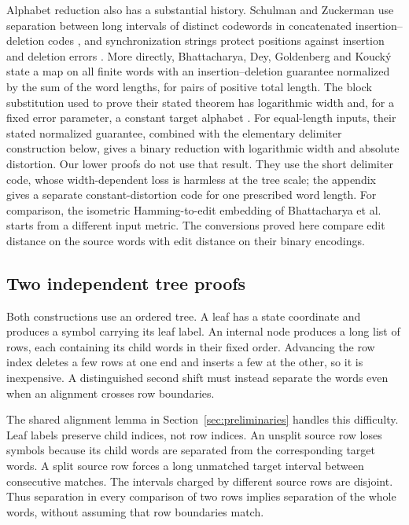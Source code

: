 Alphabet reduction also has a substantial history. Schulman and
Zuckerman use separation between long intervals of distinct codewords
in concatenated insertion--deletion codes \cite{SchulmanZuckerman1999},
and synchronization strings protect positions against insertion and
deletion errors \cite{HaeuplerShahrasbi2017}. More directly,
Bhattacharya, Dey, Goldenberg and Kouck\'y state a map on all finite
words with an insertion--deletion guarantee normalized by the sum of
the word lengths, for pairs of positive total length. The block
substitution used to prove their stated theorem has logarithmic width
and, for a fixed error parameter, a constant target alphabet
\cite[Theorem~3; full version, Section~3.2.1 and Lemma~3.3]{BhattacharyaDeyGoldenbergKoucky2024}.
For equal-length inputs, their stated normalized guarantee, combined
with the elementary delimiter construction below, gives a binary
reduction with logarithmic width and absolute distortion. Our lower
proofs do not use that result. They use the short delimiter code, whose
width-dependent loss is harmless at the tree scale; the appendix gives
a separate constant-distortion code for one prescribed word length.
For comparison, the isometric Hamming-to-edit embedding of Bhattacharya
et al.\ \cite[Theorem~7]{BhattacharyaEtAl2026} starts from a different
input metric. The conversions proved here compare edit distance on the
source words with edit distance on their binary encodings.

\subsection{Two independent tree proofs}

Both constructions use an ordered tree. A leaf has a state coordinate
and produces a symbol carrying its leaf label. An internal node produces
a long list of rows, each containing its child words in their fixed
order. Advancing the row index deletes a few rows at one end and inserts
a few at the other, so it is inexpensive. A distinguished second shift
must instead separate the words even when an alignment crosses row
boundaries.

The shared alignment lemma in Section~\ref{sec:preliminaries} handles
this difficulty. Leaf labels preserve child indices, not row indices.
An unsplit source row loses symbols because its child words are
separated from the corresponding target words. A split source row
forces a long unmatched target interval between consecutive matches.
The intervals charged by different source rows are disjoint. Thus
separation in every comparison of two rows implies separation of the
whole words, without assuming that row boundaries match.

